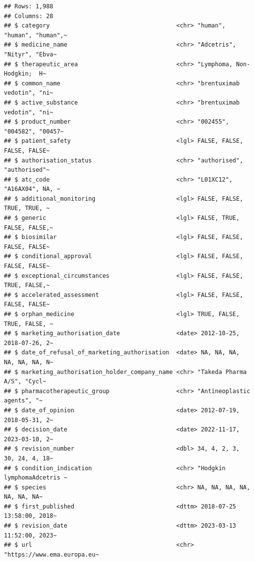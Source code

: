 \documentclass[
]{article}
\begin{document}
\begin{verbatim}
## Rows: 1,988
## Columns: 28
## $ category                                    <chr> "human", "human", "human",~
## $ medicine_name                               <chr> "Adcetris", "Nityr", "Ebva~
## $ therapeutic_area                            <chr> "Lymphoma, Non-Hodgkin;  H~
## $ common_name                                 <chr> "brentuximab vedotin", "ni~
## $ active_substance                            <chr> "brentuximab vedotin", "ni~
## $ product_number                              <chr> "002455", "004582", "00457~
## $ patient_safety                              <lgl> FALSE, FALSE, FALSE, FALSE~
## $ authorisation_status                        <chr> "authorised", "authorised"~
## $ atc_code                                    <chr> "L01XC12", "A16AX04", NA, ~
## $ additional_monitoring                       <lgl> FALSE, FALSE, TRUE, TRUE, ~
## $ generic                                     <lgl> FALSE, TRUE, FALSE, FALSE,~
## $ biosimilar                                  <lgl> FALSE, FALSE, FALSE, FALSE~
## $ conditional_approval                        <lgl> FALSE, FALSE, FALSE, FALSE~
## $ exceptional_circumstances                   <lgl> FALSE, FALSE, TRUE, FALSE,~
## $ accelerated_assessment                      <lgl> FALSE, FALSE, FALSE, FALSE~
## $ orphan_medicine                             <lgl> TRUE, FALSE, TRUE, FALSE, ~
## $ marketing_authorisation_date                <date> 2012-10-25, 2018-07-26, 2~
## $ date_of_refusal_of_marketing_authorisation  <date> NA, NA, NA, NA, NA, NA, N~
## $ marketing_authorisation_holder_company_name <chr> "Takeda Pharma A/S", "Cycl~
## $ pharmacotherapeutic_group                   <chr> "Antineoplastic agents", "~
## $ date_of_opinion                             <date> 2012-07-19, 2018-05-31, 2~
## $ decision_date                               <date> 2022-11-17, 2023-03-10, 2~
## $ revision_number                             <dbl> 34, 4, 2, 3, 30, 24, 4, 18~
## $ condition_indication                        <chr> "Hodgkin lymphomaAdcetris ~
## $ species                                     <chr> NA, NA, NA, NA, NA, NA, NA~
## $ first_published                             <dttm> 2018-07-25 13:58:00, 2018~
## $ revision_date                               <dttm> 2023-03-13 11:52:00, 2023~
## $ url                                         <chr> "https://www.ema.europa.eu~
\end{verbatim}
\end{document}
